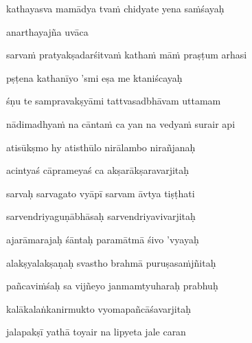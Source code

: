 kathayasva mamādya tva\.m chidyate yena sa\.mśayaḥ \veg\dontdisplaylinenum


anarthayajña uvāca~{\dandab}\dontdisplaylinenum 

sarva\.m pratyakṣadarśitva\.m katha\.m mā\.m praṣṭum arhasi\thinspace{\danda} \dontdisplaylinenum

pṣṭena kathanīyo 'smi eṣa me ktaniścayaḥ \danda\dontdisplaylinenum

śṇu te sampravakṣyāmi tattvasadbhāvam uttamam \veg\dontdisplaylinenum


nādimadhya\.m na cānta\.m ca yan na vedya\.m surair api\thinspace{\dandab} \dontdisplaylinenum

atisūkṣmo hy atisthūlo nirālambo nirañjanaḥ \veg\dontdisplaylinenum

acintyaś cāprameyaś ca akṣarākṣaravarjitaḥ\thinspace{\dandab} \dontdisplaylinenum

sarvaḥ sarvagato vyāpī sarvam āvtya tiṣṭhati \veg\dontdisplaylinenum
            \var{\vcd \om\ \Ed}%

sarvendriyaguṇābhāsaḥ sarvendriyavivarjitaḥ\thinspace{\dandab} \dontdisplaylinenum
            \var{\vab \om\ \Ed}%

ajarāmarajaḥ śāntaḥ paramātmā śivo 'vyayaḥ \veg\dontdisplaylinenum

alakṣyalakṣaṇaḥ svastho brahmā puruṣasa\.mjñitaḥ\thinspace{\dandab} \dontdisplaylinenum

pañcavi\.mśaḥ sa vijñeyo janmamtyuharaḥ prabhuḥ \veg\dontdisplaylinenum

kalākalaṅkanirmukto vyomapañcāśavarjitaḥ\thinspace{\dandab} \dontdisplaylinenum

jalapakṣī yathā toyair na lipyeta jale caran \danda\dontdisplaylinenum

